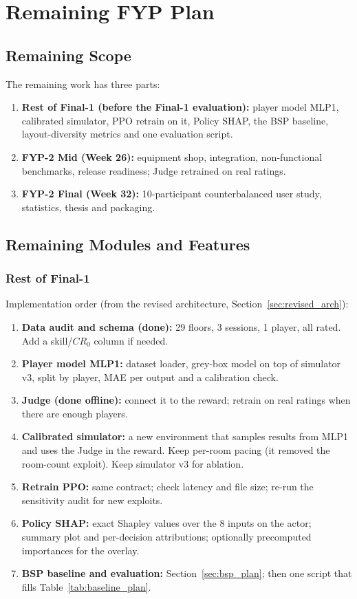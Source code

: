 \chapter{Remaining FYP Plan}
\label{chap:fyp2}

\section{Remaining Scope}
The remaining work has three parts:
\begin{enumerate}
    \item \textbf{Rest of Final-1 (before the Final-1 evaluation):} player model MLP1, calibrated simulator, PPO retrain on it, Policy SHAP, the BSP baseline, layout-diversity metrics and one evaluation script.
    \item \textbf{FYP-2 Mid (Week 26):} equipment shop, integration, non-functional benchmarks, release readiness; Judge retrained on real ratings.
    \item \textbf{FYP-2 Final (Week 32):} 10-participant counterbalanced user study, statistics, thesis and packaging.
\end{enumerate}

\section{Remaining Modules and Features}
\subsection{Rest of Final-1}
Implementation order (from the revised architecture, Section~\ref{sec:revised_arch}):
\begin{enumerate}
    \item \textbf{Data audit and schema (done):} 29 floors, 3 sessions, 1 player, all rated. Add a skill/$CR_0$ column if needed.
    \item \textbf{Player model MLP1:} dataset loader, grey-box model on top of simulator v3, split by player, MAE per output and a calibration check.
    \item \textbf{Judge (done offline):} connect it to the reward; retrain on real ratings when there are enough players.
    \item \textbf{Calibrated simulator:} a new environment that samples results from MLP1 and uses the Judge in the reward. Keep per-room pacing (it removed the room-count exploit). Keep simulator v3 for ablation.
    \item \textbf{Retrain PPO:} same contract; check latency and file size; re-run the sensitivity audit for new exploits.
    \item \textbf{Policy SHAP:} exact Shapley values over the 8 inputs on the actor; summary plot and per-decision attributions; optionally precomputed importances for the overlay.
    \item \textbf{BSP baseline and evaluation:} Section~\ref{sec:bsp_plan}; then one script that fills Table~\ref{tab:baseline_plan}.
\end{enumerate}

